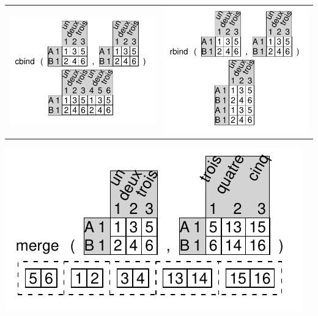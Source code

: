\documentclass[pdflatex]{article}
\begin{document}
\begin{tabular}{cc}
\includegraphics{cbind.pdf} & \includegraphics{rbind.pdf}\\
\end{tabular}

\includegraphics{merge.pdf} 
\end{document}
